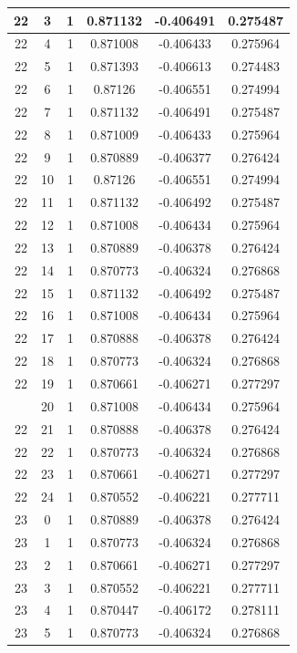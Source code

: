 \documentclass[12pt,a4paper]{article}
\numberwithin{equation}{section}
\numberwithin{figure}{section}
\numberwithin{table}{section}
\begin{document}
\begin{longtable}{|c|c|c|c|c|c|}
22 & 3 & 1 & 0.871132 & -0.406491 & 0.275487 \\ \hline
22 & 4 & 1 & 0.871008 & -0.406433 & 0.275964 \\ \hline
22 & 5 & 1 & 0.871393 & -0.406613 & 0.274483 \\ \hline
22 & 6 & 1 & 0.87126 & -0.406551 & 0.274994 \\ \hline
22 & 7 & 1 & 0.871132 & -0.406491 & 0.275487 \\ \hline
22 & 8 & 1 & 0.871009 & -0.406433 & 0.275964 \\ \hline
22 & 9 & 1 & 0.870889 & -0.406377 & 0.276424 \\ \hline
22 & 10 & 1 & 0.87126 & -0.406551 & 0.274994 \\ \hline
22 & 11 & 1 & 0.871132 & -0.406492 & 0.275487 \\ \hline
22 & 12 & 1 & 0.871008 & -0.406434 & 0.275964 \\ \hline
22 & 13 & 1 & 0.870889 & -0.406378 & 0.276424 \\ \hline
22 & 14 & 1 & 0.870773 & -0.406324 & 0.276868 \\ \hline
22 & 15 & 1 & 0.871132 & -0.406492 & 0.275487 \\ \hline
22 & 16 & 1 & 0.871008 & -0.406434 & 0.275964 \\ \hline
22 & 17 & 1 & 0.870888 & -0.406378 & 0.276424 \\ \hline
22 & 18 & 1 & 0.870773 & -0.406324 & 0.276868 \\ \hline
22 & 19 & 1 & 0.870661 & -0.406271 & 0.277297 \\ \hline
\pagebreak
22 & 20 & 1 & 0.871008 & -0.406434 & 0.275964 \\ \hline
22 & 21 & 1 & 0.870888 & -0.406378 & 0.276424 \\ \hline
22 & 22 & 1 & 0.870773 & -0.406324 & 0.276868 \\ \hline
22 & 23 & 1 & 0.870661 & -0.406271 & 0.277297 \\ \hline
22 & 24 & 1 & 0.870552 & -0.406221 & 0.277711 \\ \hline
23 & 0 & 1 & 0.870889 & -0.406378 & 0.276424 \\ \hline
23 & 1 & 1 & 0.870773 & -0.406324 & 0.276868 \\ \hline
23 & 2 & 1 & 0.870661 & -0.406271 & 0.277297 \\ \hline
23 & 3 & 1 & 0.870552 & -0.406221 & 0.277711 \\ \hline
23 & 4 & 1 & 0.870447 & -0.406172 & 0.278111 \\ \hline
23 & 5 & 1 & 0.870773 & -0.406324 & 0.276868 \\ \hline

\end{longtable}
\end{document}
